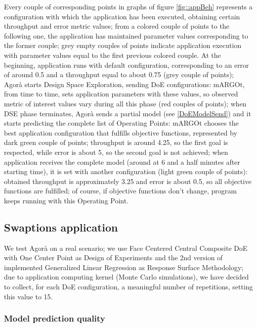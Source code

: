 Every couple of corresponding points in graphs of figure \ref{fig::appBeh} represents a configuration with which the application has been executed, obtaining certain throughput and error metric values; from a colored couple of points to the following one, the application has maintained parameter values corresponding to the former couple; grey empty couples of points indicate application execution with parameter values equal to the first previous colored couple. At the beginning, application runs with default configuration, corresponding to an error of around 0.5 and a throughput equal to about 0.75 (grey couple of points); Agorà starts Design Space Exploration, sending DoE configurations: mARGOt, from time to time, sets application parameters with these values, so observed metric of interest values vary during all this phase (red couples of points); when DSE phase terminates, Agorà sends a partial model (see \ref{DoEModelSend}) and it starts predicting the complete list of Operating Points: mARGOt chooses the best application configuration that fulfills objective functions, represented by dark green couple of points; throughput is around 4.25, so the first goal is respected, while error is about 5, so the second goal is not achieved; when application receives the complete model (around at 6 and a half minutes after starting time), it is set with another configuration (light green couple of points): obtained throughput is approximately 3.25 and error is about 0.5, so all objective functions are fulfilled; of course, if objective functions don't change, program keeps running with this Operating Point.




\subsection{Swaptions application}

We test Agorà on a real scenario; we use Face Centered Central Composite DoE with One Center Point as Design of Experiments and the 2nd version of implemented Generalized Linear Regression as Response Surface Methodology; due to application computing kernel (Monte Carlo simulations), we have decided to collect, for each DoE configuration, a meaningful number of repetitions, setting this value to 15.


\subsubsection{Model prediction quality}


